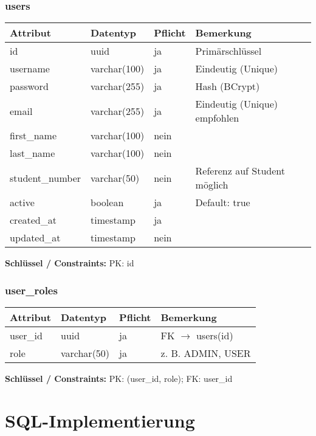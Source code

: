 \documentclass[12pt,a4paper]{article}
\begin{document}
    \subsubsection{users}
    \begin{longtable}{|L{4cm}|L{3cm}|L{3cm}|L{4cm}|}
        \hline
        \textbf{Attribut} & \textbf{Datentyp} & \textbf{Pflicht} & \textbf{Bemerkung} \\ \hline
        id & uuid & ja & Primärschlüssel \\ \hline
        username & varchar(100) & ja & Eindeutig (Unique) \\ \hline
        password & varchar(255) & ja & Hash (BCrypt) \\ \hline
        email & varchar(255) & ja & Eindeutig (Unique) empfohlen \\ \hline
        first\_name & varchar(100) & nein &  \\ \hline
        last\_name & varchar(100) & nein &  \\ \hline
        student\_number & varchar(50) & nein & Referenz auf Student möglich \\ \hline
        active & boolean & ja & Default: true \\ \hline
        created\_at & timestamp & ja &  \\ \hline
        updated\_at & timestamp & nein &  \\ \hline
    \end{longtable}
    \textbf{Schlüssel / Constraints:} PK: id

    \subsubsection{user\_roles}
    \begin{longtable}{|L{4cm}|L{3cm}|L{3cm}|L{4cm}|}
        \hline
        \textbf{Attribut} & \textbf{Datentyp} & \textbf{Pflicht} & \textbf{Bemerkung} \\ \hline
        user\_id & uuid & ja & FK $\rightarrow$ users(id) \\ \hline
        role & varchar(50) & ja & z. B. ADMIN, USER \\ \hline
    \end{longtable}
    \textbf{Schlüssel / Constraints:} PK: (user\_id, role); FK: user\_id
    \newpage

    \section{SQL-Implementierung}
\end{document}
